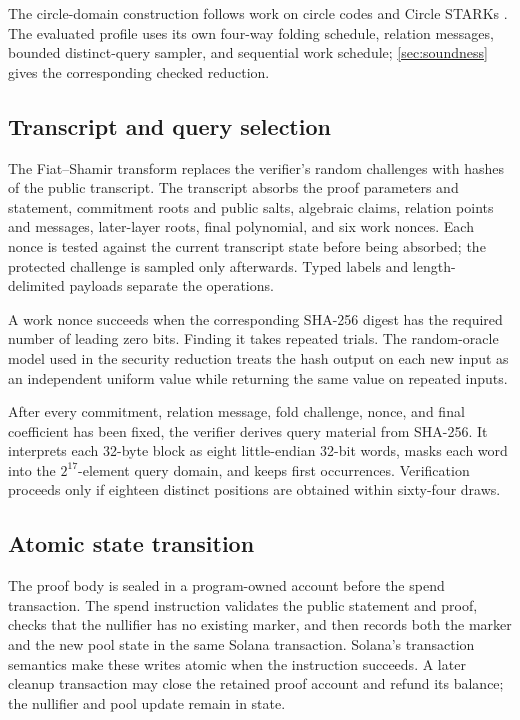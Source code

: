 The circle-domain construction follows work on circle codes and Circle
STARKs \cite{HaboeckLubarovNabaglo2023,HaboeckLevitPapini2024,
CarmonEtAl2026Stwo}.  The evaluated profile uses its own four-way folding
schedule, relation messages, bounded distinct-query sampler, and sequential
work schedule; \cref{sec:soundness} gives the corresponding checked reduction.

\subsection{Transcript and query selection}

The Fiat--Shamir transform replaces the verifier's random challenges with
hashes of the public transcript.  The transcript absorbs the proof parameters and
statement, commitment roots and public salts, algebraic claims, relation
points and messages, later-layer roots, final polynomial, and six work
nonces.  Each nonce is tested against the current transcript state before
being absorbed; the protected challenge is sampled only afterwards.  Typed
labels and length-delimited payloads separate the operations.

A work nonce succeeds when the corresponding SHA-256 digest has the required
number of leading zero bits.  Finding it takes repeated trials.  The
random-oracle model used in the security reduction treats the hash output on
each new input as an independent uniform value while returning the same value
on repeated inputs.

After every commitment, relation message, fold challenge, nonce, and final
coefficient has been fixed, the verifier derives query material from SHA-256.
It interprets each 32-byte block as eight little-endian 32-bit words, masks
each word into the \(2^{17}\)-element query domain, and keeps first
occurrences.  Verification proceeds only if eighteen distinct positions are
obtained within sixty-four draws.

\subsection{Atomic state transition}

The proof body is sealed in a program-owned account before the spend
transaction.  The spend instruction validates the public statement and proof,
checks that the nullifier has no existing marker, and then records both the
marker and the new pool state in the same Solana transaction.  Solana's
transaction semantics make these writes atomic when the instruction succeeds.
A later cleanup transaction may close the retained proof account and refund
its balance; the nullifier and pool update remain in state.
